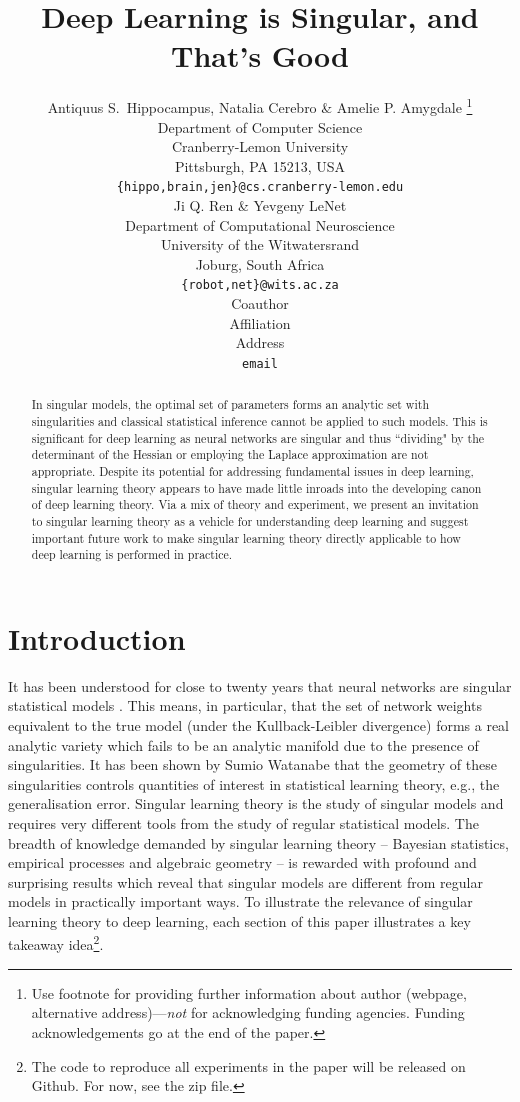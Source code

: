 \documentclass{article} %
\title{Deep Learning is Singular, and That's Good}
\author{Antiquus S.~Hippocampus, Natalia Cerebro \& Amelie P. Amygdale \thanks{ Use footnote for providing further information
about author (webpage, alternative address)---\emph{not} for acknowledging
funding agencies.  Funding acknowledgements go at the end of the paper.} \\
Department of Computer Science\\
Cranberry-Lemon University\\
Pittsburgh, PA 15213, USA \\
\texttt{\{hippo,brain,jen\}@cs.cranberry-lemon.edu} \\
\And
Ji Q. Ren \& Yevgeny LeNet \\
Department of Computational Neuroscience \\
University of the Witwatersrand \\
Joburg, South Africa \\
\texttt{\{robot,net\}@wits.ac.za} \\
\AND
Coauthor \\
Affiliation \\
Address \\
\texttt{email}
}
\begin{document}
\maketitle

\begin{abstract}
In singular models, the optimal set of parameters forms an analytic set with singularities and classical statistical inference cannot be applied to such models. This is significant for deep learning as neural networks are singular and thus ``dividing" by the determinant of the Hessian or employing the Laplace approximation are not appropriate. Despite its potential for addressing fundamental issues in deep learning, singular learning theory appears to have made little inroads into the developing canon of deep learning theory. Via a mix of theory and experiment, we present an invitation to singular learning theory as a vehicle for understanding deep learning and suggest important future work to make singular learning theory directly applicable to how deep learning is performed in practice. 
\end{abstract}

\section{Introduction}

It has been understood for close to twenty years that neural networks are singular statistical models \citep{amari_learning_2003, watanabe_almost_2007}. This means, in particular, that the set of network weights equivalent to the true model (under the Kullback-Leibler divergence) forms a real analytic variety which fails to be an analytic manifold due to the presence of singularities. It has been shown by Sumio Watanabe that the geometry of these singularities controls quantities of interest in statistical learning theory, e.g., the generalisation error. Singular learning theory \citep{watanabe_algebraic_2009} is the study of singular models and requires very different tools from the study of regular statistical models. The breadth of knowledge demanded by singular learning theory -- Bayesian statistics, empirical processes and algebraic geometry -- is rewarded with profound and surprising results which reveal that singular models are different from regular models in practically important ways.
To illustrate the relevance of singular learning theory to deep learning, each section of this paper illustrates a key takeaway idea\footnote{The code to reproduce all experiments in the paper will be released on Github. For now, see the zip file.}. 
\end{document}
